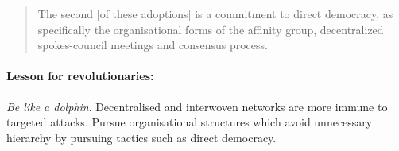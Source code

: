 \begin{quote}
	The second [of these adoptions] is a commitment to direct democracy, as specifically the organisational forms of the affinity group, decentralized spokes-council meetings and consensus process.
\end{quote}
\begin{tcolorbox}
	\paragraph{Lesson for revolutionaries:} \textit{Be like a dolphin}. Decentralised and interwoven networks are more immune to targeted attacks. Pursue organisational structures which avoid unnecessary hierarchy by pursuing tactics such as direct democracy.
\end{tcolorbox}
